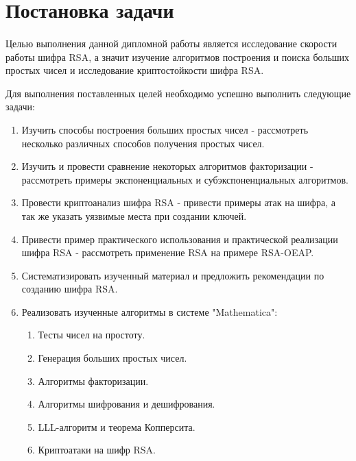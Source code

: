 \section*{Постановка задачи}

  \paragraph{} Целью выполнения данной дипломной работы является исследование скорости работы шифра RSA, а значит изучение алгоритмов построения и поиска больших простых чисел и исследование криптостойкости шифра RSA.

    Для выполнения поставленных целей необходимо успешно выполнить следующие задачи:

    \begin{enumerate}
      \item Изучить способы построения больших простых чисел - рассмотреть несколько различных способов получения простых чисел.
      \item Изучить и провести сравнение некоторых алгоритмов факторизации - рассмотреть примеры экспоненциальных и субэкспоненциальных алгоритмов.
      \item Провести криптоанализ шифра RSA - привести примеры атак на шифра, а так же указать уязвимые места при создании ключей.
      \item Привести пример практического использования и практической реализации шифра RSA - рассмотреть применение RSA на примере RSA-OEAP.
      \item Систематизировать изученный материал и предложить рекомендации по созданию шифра RSA.
      \item Реализовать изученные алгоритмы в системе "Mathematica":
        \begin{enumerate}
          \item Тесты чисел на простоту.
          \item Генерация больших простых чисел.
          \item Алгоритмы факторизации.
          \item Алгоритмы шифрования и дешифрования.
          \item LLL-алгоритм и теорема Копперсита.
          \item Криптоатаки на шифр RSA.
        \end{enumerate}
    \end{enumerate}